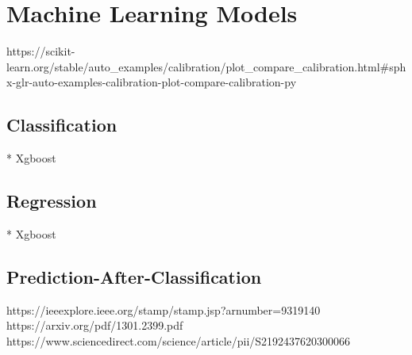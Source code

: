 \documentclass[../../main.tex]{subfiles}
\begin{document}

\section{Machine Learning Models}

https://scikit-learn.org/stable/auto_examples/calibration/plot_compare_calibration.html#sphx-glr-auto-examples-calibration-plot-compare-calibration-py

\subsection{Classification}
* Xgboost

\subsection{Regression}
* Xgboost

\subsection{Prediction-After-Classification}
https://ieeexplore.ieee.org/stamp/stamp.jsp?arnumber=9319140
https://arxiv.org/pdf/1301.2399.pdf
https://www.sciencedirect.com/science/article/pii/S2192437620300066

\end{document}
